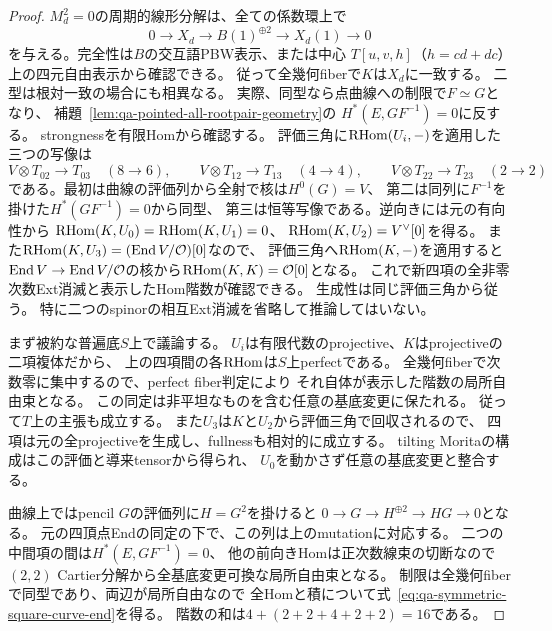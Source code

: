 \begin{proof}
$M_d^2=0$の周期的線形分解は、全ての係数環上で
\begin{equation}
 0\longrightarrow X_d\longrightarrow B(1)^{\oplus2}
 \longrightarrow X_d(1)\longrightarrow0
 \label{eq:qa-symmetric-square-spinor-evaluation}
\end{equation}
を与える。完全性は$B$の交互語PBW表示、または中心
$T[u,v,h]$（$h=cd+dc$）上の四元自由表示から確認できる。
従って全幾何fiberで$K$は$X_d$に一致する。
二型は根対一致の場合にも相異なる。
実際、同型なら点曲線への制限で$F\simeq G$となり、
補題~\ref{lem:qa-pointed-all-rootpair-geometry}の
$H^*(E,GF^{-1})=0$に反する。
strongnessを有限Homから確認する。
評価三角に$\operatorname{RHom}(U_i,-)$を適用した三つの写像は
\[
 V\otimes T_{02}\longrightarrow T_{03}\quad(8\to6),\qquad
 V\otimes T_{12}\longrightarrow T_{13}\quad(4\to4),\qquad
 V\otimes T_{22}\longrightarrow T_{23}\quad(2\to2)
\]
である。最初は曲線の評価列から全射で核は$H^0(G)=V$、
第二は同列に$F^{-1}$を掛けた$H^*(GF^{-1})=0$から同型、
第三は恒等写像である。逆向きには元の有向性から
$\operatorname{RHom}(K,U_0)=\operatorname{RHom}(K,U_1)=0$、
$\operatorname{RHom}(K,U_2)=V^\vee[0]$を得る。
また$\operatorname{RHom}(K,U_3)=(\operatorname{End} V/\mathcal O)[0]$なので、
評価三角へ$\operatorname{RHom}(K,-)$を適用すると
$\operatorname{End} V\to\operatorname{End} V/\mathcal O$の核から$\operatorname{RHom}(K,K)=\mathcal O[0]$となる。
これで新四項の全非零次数Ext消滅と表示したHom階数が確認できる。
生成性は同じ評価三角から従う。
特に二つのspinorの相互Ext消滅を省略して推論してはいない。

まず被約な普遍底$S$上で議論する。
$U_i$は有限代数のprojective、$K$はprojectiveの二項複体だから、
上の四項間の各$\operatorname{RHom}$は$S$上perfectである。
全幾何fiberで次数零に集中するので、perfect fiber判定により
それ自体が表示した階数の局所自由束となる。
この同定は非平坦なものを含む任意の基底変更に保たれる。
従って$T$上の主張も成立する。
また$U_3$は$K$と$U_2$から評価三角で回収されるので、
四項は元の全projectiveを生成し、fullnessも相対的に成立する。
tilting Moritaの構成はこの評価と導来tensorから得られ、
$U_0$を動かさず任意の基底変更と整合する。

曲線上ではpencil $G$の評価列に$H=G^2$を掛けると
$0\to G\to H^{\oplus2}\to HG\to0$となる。
元の四頂点Endの同定の下で、この列は上のmutationに対応する。
二つの中間項の間は$H^*(E,GF^{-1})=0$、
他の前向きHomは正次数線束の切断なので
$(2,2)$ Cartier分解から全基底変更可換な局所自由束となる。
制限は全幾何fiberで同型であり、両辺が局所自由なので
全Homと積について式~\eqref{eq:qa-symmetric-square-curve-end}を得る。
階数の和は$4+(2+2+4+2+2)=16$である。
\end{proof}

